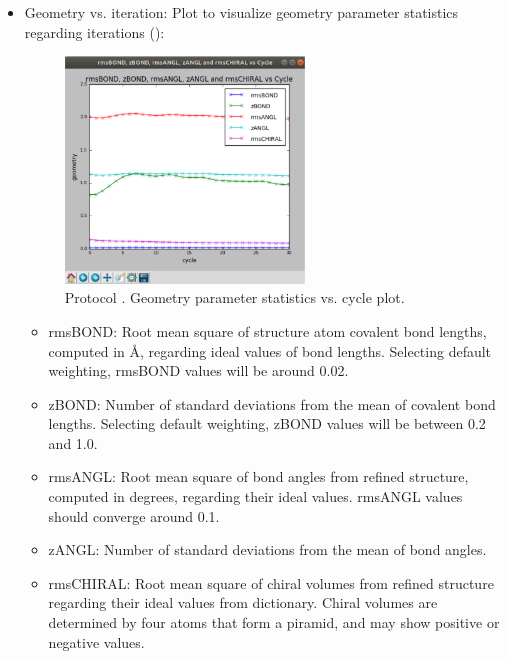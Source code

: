 \begin{itemize}
\begin{itemize}
\begin{figure}[H]
         \label{fig:app_protocol_refmac_11}
        \end{figure}
     \item Geometry vs. iteration:
     Plot to visualize geometry parameter statistics regarding iterations ():
     \begin{figure}[H]
         \centering 
         \captionsetup{width=.7\linewidth} 
         \includegraphics[width=0.60\textwidth]{Images_appendix/Fig137.pdf}
         \caption{Protocol . Geometry parameter statistics vs. cycle plot.}
         \label{fig:app_protocol_refmac_12}
        \end{figure}
     \begin{itemize}
     \item rmsBOND: Root mean square of structure atom covalent bond lengths, computed in \AA, regarding ideal values of bond lengths. Selecting default weighting, rmsBOND values will be around 0.02.
     
     \item zBOND: Number of standard deviations from the mean of covalent bond lengths. Selecting default weighting, zBOND values will be between 0.2 and 1.0.
     
     \item rmsANGL: Root mean square of bond angles from refined structure, computed in degrees, regarding their ideal values. rmsANGL values should converge around 0.1.
     
     \item zANGL: Number of standard deviations from the mean of bond angles. 
     
     \item rmsCHIRAL: Root mean square of chiral volumes from refined structure regarding their ideal values from dictionary. Chiral volumes are determined by four atoms that form a piramid, and may show positive or negative values. 
     \end{itemize}
    \end{itemize}


\end{itemize}
